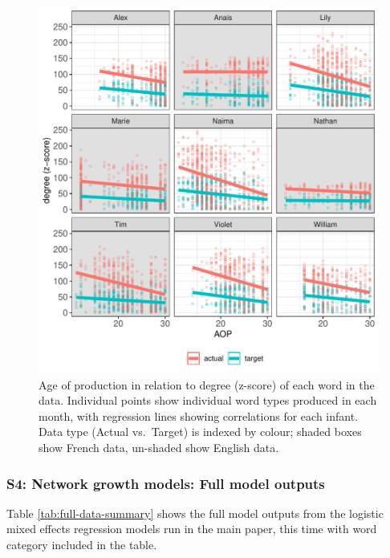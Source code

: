 \documentclass[
  man,floatsintext]{apa6}
\begin{document}
\begin{figure}
\centering
\includegraphics{PhonNetworksSupplementaryData_files/figure-latex/Figure-AOP-deg-corr-1.pdf}
\caption{\label{fig:Figure-AOP-deg-corr}Age of production in relation to degree (z-score) of each word in the data. Individual points show individual word types produced in each month, with regression lines showing correlations for each infant. Data type (Actual vs.~Target) is indexed by colour; shaded boxes show French data, un-shaded show English data.}
\end{figure}

\newpage

\hypertarget{s4-network-growth-models-full-model-outputs}{%
\subsubsection{S4: Network growth models: Full model outputs}\label{s4-network-growth-models-full-model-outputs}}

Table \ref{tab:full-data-summary} shows the full model outputs from the logistic mixed effects regression models run in the main paper, this time with word category included in the table.

\begingroup\fontsize{7}{9}\selectfont
\end{document}
